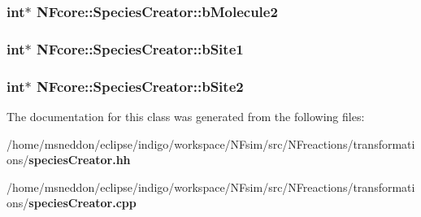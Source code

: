 \subsubsection{\setlength{\rightskip}{0pt plus 5cm}int$\ast$ {\bf NFcore::SpeciesCreator::bMolecule2}\hspace{0.3cm}{\tt  [protected]}}\label{classNFcore_1_1SpeciesCreator_8d4caa643ae21910fc49577331b6e9aa}


\subsubsection{\setlength{\rightskip}{0pt plus 5cm}int$\ast$ {\bf NFcore::SpeciesCreator::bSite1}\hspace{0.3cm}{\tt  [protected]}}\label{classNFcore_1_1SpeciesCreator_5c07bfe05a98d21564079015559defc0}


\subsubsection{\setlength{\rightskip}{0pt plus 5cm}int$\ast$ {\bf NFcore::SpeciesCreator::bSite2}\hspace{0.3cm}{\tt  [protected]}}\label{classNFcore_1_1SpeciesCreator_709c3005ce881579df83cb7c3e0c45aa}




The documentation for this class was generated from the following files:\begin{CompactItemize}
\item 
/home/msneddon/eclipse/indigo/workspace/NFsim/src/NFreactions/transformations/{\bf speciesCreator.hh}\item 
/home/msneddon/eclipse/indigo/workspace/NFsim/src/NFreactions/transformations/{\bf speciesCreator.cpp}\end{CompactItemize}
